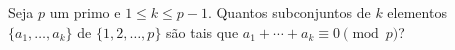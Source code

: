 Seja $p$ um primo e $1 \le k \le p - 1$.
Quantos subconjuntos de $k$ elementos $\{a_1, \dots, a_k \}$ de $\{1, 2, \dots, p\}$ são tais que $a_1 + \cdots + a_k \equiv 0 \pmod{p}$?
